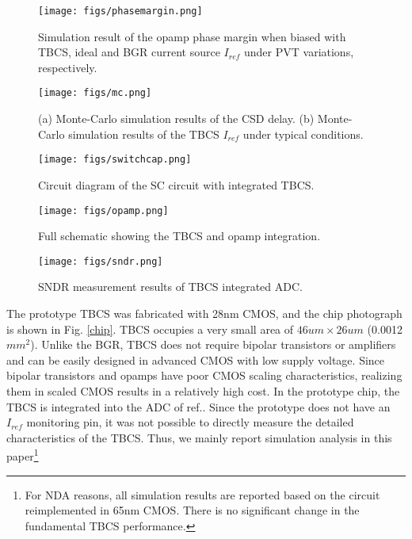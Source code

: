 \documentclass[paper]{ieice}
\begin{document}
\begin{figure}[!t]
\centering
 \texttt{[image: figs/phasemargin.png]}
  \caption{Simulation result of the opamp phase margin when biased with TBCS, ideal and BGR current source $I_{ref}$ under PVT variations, respectively.
}
\label{opamp_pm}
\end{figure}

\begin{figure}[!t]
\centering
 \texttt{[image: figs/mc.png]}
  \caption{(a) Monte-Carlo simulation results of the CSD delay. (b) Monte-Carlo simulation results of the TBCS $I_{ref}$ under typical conditions.
}
\label{monte}
\end{figure}

\begin{figure}[!t]
\centering
 \texttt{[image: figs/switchcap.png]}
  \caption{Circuit diagram of the SC circuit with integrated TBCS.}
\label{scap}
\end{figure}

\begin{figure}[!t]
\centering
 \texttt{[image: figs/opamp.png]}
  \caption{Full schematic showing the TBCS and opamp integration.}
\label{opamp}
\end{figure}

\begin{figure}[!t]
\centering
 \texttt{[image: figs/sndr.png]}
  \caption{SNDR measurement results of TBCS integrated ADC.}
\label{sndr}
\end{figure}



\qquad The prototype TBCS was fabricated with 28nm CMOS, and the chip photograph is shown in Fig. \ref{chip}. TBCS occupies a very small area of $46um \times 26um$ (0.0012$mm^2$). Unlike the BGR, TBCS does not require bipolar transistors or amplifiers and can be easily designed in advanced CMOS with low supply voltage. Since bipolar transistors and opamps have poor CMOS scaling characteristics, realizing them in scaled CMOS results in a relatively high cost. In the prototype chip, the TBCS is integrated into the ADC of ref.\cite{yoshioka201728}. Since the prototype does not have an $I_{ref}$ monitoring pin, it was not possible to directly measure the detailed characteristics of the TBCS. Thus, we mainly report simulation analysis in this paper\footnote{For NDA reasons, all simulation results are reported based on the circuit reimplemented in 65nm CMOS. There is no significant change in the fundamental TBCS performance.}
\end{document}
